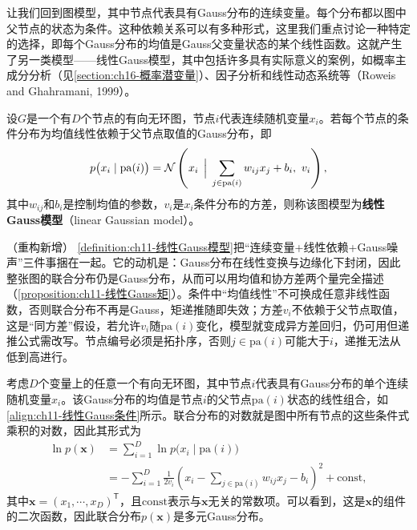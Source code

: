\documentclass[../../main.tex]{subfiles}
\begin{document}
让我们回到图模型，其中节点代表具有Gauss分布的连续变量。每个分布都以图中父节点的状态为条件。这种依赖关系可以有多种形式，这里我们重点讨论一种特定的选择，即每个Gauss分布的均值是Gauss父变量状态的某个线性函数。这就产生了另一类模型——线性Gauss模型，其中包括许多具有实际意义的案例，如概率主成分分析（见\cref{section:ch16-概率潜变量}）、因子分析和线性动态系统等（Roweis and Ghahramani, 1999）。

\begin{definition}[线性Gauss模型]\label{definition:ch11-线性Gauss模型}
设$G$是一个有$D$个节点的有向无环图，节点$i$代表连续随机变量$x_i$。若每个节点的条件分布为均值线性依赖于父节点取值的Gauss分布，即
\begin{align}
  p\bigl(x_i\mid \mathrm{pa}(i)\bigr) = \mathcal{N}\left(x_i\,\Bigm|\, \sum_{j\in \mathrm{pa}(i)}w_{ij}x_j+b_i,\ v_i\right),
  \label{align:ch11-线性Gauss条件}
\end{align}
其中$w_{ij}$和$b_i$是控制均值的参数，$v_i$是$x_i$条件分布的方差，则称该图模型为\textbf{线性Gauss模型}（linear Gaussian model）。
\end{definition}

\begin{remark}（重构新增）
\cref{definition:ch11-线性Gauss模型}把“连续变量+线性依赖+Gauss噪声”三件事捆在一起。它的动机是：Gauss分布在线性变换与边缘化下封闭，因此整张图的联合分布仍是Gauss分布，从而可以用均值和协方差两个量完全描述（\cref{proposition:ch11-线性Gauss矩}）。条件中“均值线性”不可换成任意非线性函数，否则联合分布不再是Gauss，矩递推随即失效；方差$v_i$不依赖于父节点取值，这是“同方差”假设，若允许$v_i$随$\mathrm{pa}(i)$变化，模型就变成异方差回归，仍可用但递推公式需改写。节点编号必须是拓扑序，否则$j\in\mathrm{pa}(i)$可能大于$i$，递推无法从低到高进行。
\end{remark}

考虑$D$个变量上的任意一个有向无环图，其中节点$i$代表具有Gauss分布的单个连续随机变量$x_i$。该Gauss分布的均值是节点$i$的父节点$\mathrm{pa}(i)$状态的线性组合，如\eqref{align:ch11-线性Gauss条件}所示。联合分布的对数就是图中所有节点的这些条件式乘积的对数，因此其形式为
\begin{align}
  \ln p(\mathbf{x}) &= \sum_{i=1}^{D}\ln p\bigl(x_i\mid \mathrm{pa}(i)\bigr)\nonumber\\
  &= -\sum_{i=1}^{D}\frac{1}{2v_i}\left(x_i-\sum_{j\in\mathrm{pa}(i)}w_{ij}x_j-b_i\right)^{2}+\mathrm{const},
  \label{align:ch11-线性Gauss对数}
\end{align}
其中$\mathbf{x}=(x_1,\cdots,x_D)^{\mathsf{T}}$，且$\mathrm{const}$表示与$\mathbf{x}$无关的常数项。可以看到，这是$\mathbf{x}$的组件的二次函数，因此联合分布$p(\mathbf{x})$是多元Gauss分布。
\end{document}
